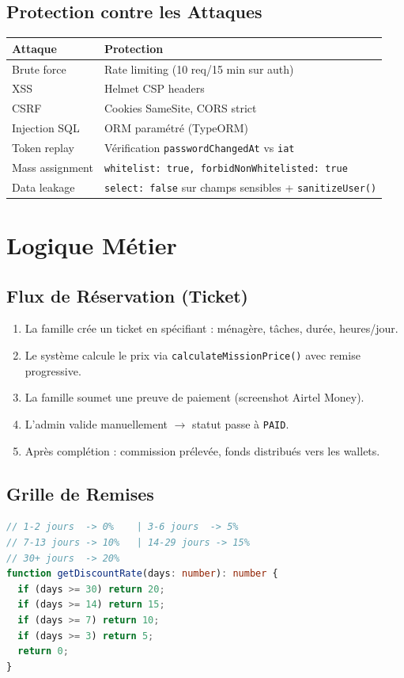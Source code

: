 \documentclass[12pt,a4paper]{report}
\begin{document}
\section{Protection contre les Attaques}
\begin{longtable}{@{}p{4cm}p{9cm}@{}}
\toprule
\textbf{Attaque} & \textbf{Protection} \\
\midrule
Brute force & Rate limiting (10 req/15 min sur auth) \\
XSS & Helmet CSP headers \\
CSRF & Cookies SameSite, CORS strict \\
Injection SQL & ORM paramétré (TypeORM) \\
Token replay & Vérification \texttt{passwordChangedAt} vs \texttt{iat} \\
Mass assignment & \texttt{whitelist: true, forbidNonWhitelisted: true} \\
Data leakage & \texttt{select: false} sur champs sensibles + \texttt{sanitizeUser()} \\
\bottomrule
\end{longtable}

\chapter{Logique Métier}

\section{Flux de Réservation (Ticket)}
\begin{enumerate}
  \item La famille crée un ticket en spécifiant : ménagère, tâches, durée, heures/jour.
  \item Le système calcule le prix via \texttt{calculateMissionPrice()} avec remise progressive.
  \item La famille soumet une preuve de paiement (screenshot Airtel Money).
  \item L'admin valide manuellement $\to$ statut passe à \texttt{PAID}.
  \item Après complétion : commission prélevée, fonds distribués vers les wallets.
\end{enumerate}

\section{Grille de Remises}
\begin{lstlisting}[language=TypeScript,title={pricing.util.ts}]
// 1-2 jours  -> 0%    | 3-6 jours  -> 5%
// 7-13 jours -> 10%   | 14-29 jours -> 15%
// 30+ jours  -> 20%
function getDiscountRate(days: number): number {
  if (days >= 30) return 20;
  if (days >= 14) return 15;
  if (days >= 7) return 10;
  if (days >= 3) return 5;
  return 0;
}
\end{lstlisting}
\end{document}
